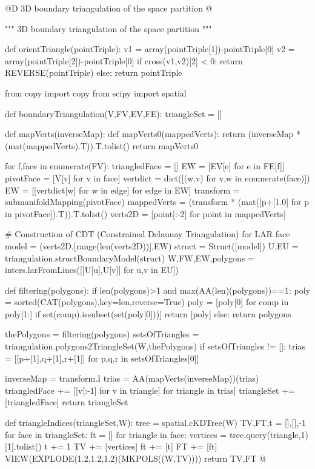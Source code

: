\documentclass[11pt,oneside]{article}    %
\begin{document}
@D 3D boundary triangulation of the space partition 
@{""" 3D boundary triangulation of the space partition """

def orientTriangle(pointTriple):
    v1 = array(pointTriple[1])-pointTriple[0]
    v2 = array(pointTriple[2])-pointTriple[0]
    if cross(v1,v2)[2] < 0: return REVERSE(pointTriple)
    else: return pointTriple
    
from copy import copy
from scipy import spatial

def boundaryTriangulation(V,FV,EV,FE):
    triangleSet = []  
        
    def mapVerts(inverseMap):
        def mapVerts0(mappedVerts):
            return (inverseMap * (mat(mappedVerts).T)).T.tolist()
        return mapVerts0
        
    for f,face in enumerate(FV):
        triangledFace = []
        EW = [EV[e] for e in FE[f]]
        pivotFace = [V[v] for v in face]
        vertdict = dict([(w,v) for v,w in enumerate(face)])
        EW = [[vertdict[w] for w in edge] for edge in EW]
        transform = submanifoldMapping(pivotFace)
        mappedVerts = (transform * (mat([p+[1.0] for p in pivotFace]).T)).T.tolist()
        verts2D = [point[:-2] for point in mappedVerts] 
              
        # Construction of CDT (Constrained Delaunay Triangulation) for LAR face
        model = (verts2D,[range(len(verts2D))],EW)
        struct = Struct([model])
        U,EU = triangulation.structBoundaryModel(struct)
        W,FW,EW,polygons = inters.larFromLines([[U[u],U[v]] for u,v in EU])

        def filtering(polygons):
            if len(polygons)>1 and max(AA(len)(polygons))==1:
                poly = sorted(CAT(polygons),key=len,reverse=True)
                poly = [poly[0] for comp in poly[1:] if set(comp).issubset(set(poly[0]))]
                return [poly]
            else: return polygons

        thePolygons = filtering(polygons)
        setsOfTriangles = triangulation.polygons2TriangleSet(W,thePolygons)
        if setsOfTriangles != []:
            trias = [[p+[1],q+[1],r+[1]] for p,q,r in setsOfTriangles[0]]
            
            inverseMap = transform.I
            trias = AA(mapVerts(inverseMap))(trias)
            triangledFace += [[v[:-1] for v in triangle] for triangle in trias]
            triangleSet += [triangledFace]
    return triangleSet

def triangleIndices(triangleSet,W):
    tree = spatial.cKDTree(W)
    TV,FT,t = [],[],-1
    for face in triangleSet:
        ft = []
        for triangle in face:
            vertices = tree.query(triangle,1)[1].tolist()
            t += 1
            TV += [vertices]
            ft += [t]
        FT += [ft]
    VIEW(EXPLODE(1.2,1.2,1.2)(MKPOLS((W,TV))))
    return TV,FT
@}
\end{document}

